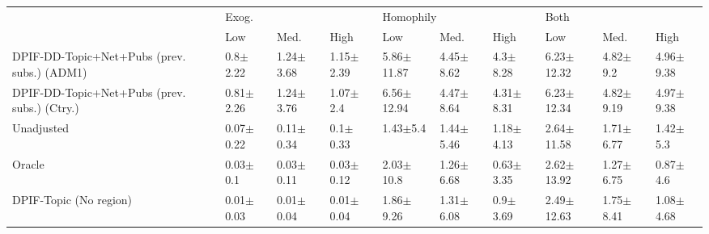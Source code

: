 \begin{tabular}{llllllllll}
\toprule
{} & \multicolumn{3}{l}{Exog.} & \multicolumn{3}{l}{Homophily} & \multicolumn{3}{l}{Both} \\
{} &            Low &           Med. &           High &             Low &           Med. &           High &             Low &           Med. &           High \\
\midrule
DPIF-DD-Topic+Net+Pubs (prev. subs.) (ADM1)  &   0.8$\pm$2.22 &  1.24$\pm$3.68 &  1.15$\pm$2.39 &  5.86$\pm$11.87 &  4.45$\pm$8.62 &   4.3$\pm$8.28 &  6.23$\pm$12.32 &   4.82$\pm$9.2 &  4.96$\pm$9.38 \\
DPIF-DD-Topic+Net+Pubs (prev. subs.) (Ctry.) &  0.81$\pm$2.26 &  1.24$\pm$3.76 &   1.07$\pm$2.4 &  6.56$\pm$12.94 &  4.47$\pm$8.64 &  4.31$\pm$8.31 &  6.23$\pm$12.34 &  4.82$\pm$9.19 &  4.97$\pm$9.38 \\
Unadjusted                                   &  0.07$\pm$0.22 &  0.11$\pm$0.34 &   0.1$\pm$0.33 &    1.43$\pm$5.4 &  1.44$\pm$5.46 &  1.18$\pm$4.13 &  2.64$\pm$11.58 &  1.71$\pm$6.77 &   1.42$\pm$5.3 \\
Oracle                                       &   0.03$\pm$0.1 &  0.03$\pm$0.11 &  0.03$\pm$0.12 &   2.03$\pm$10.8 &  1.26$\pm$6.68 &  0.63$\pm$3.35 &  2.62$\pm$13.92 &  1.27$\pm$6.75 &   0.87$\pm$4.6 \\
DPIF-Topic (No region)                       &  0.01$\pm$0.03 &  0.01$\pm$0.04 &  0.01$\pm$0.04 &   1.86$\pm$9.26 &  1.31$\pm$6.08 &   0.9$\pm$3.69 &  2.49$\pm$12.63 &  1.75$\pm$8.41 &  1.08$\pm$4.68 \\
\bottomrule
\end{tabular}
